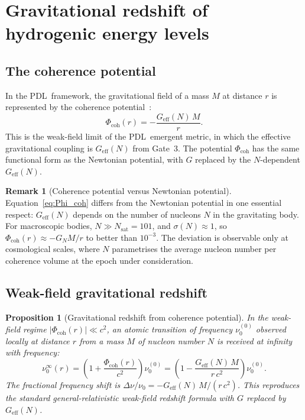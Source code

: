 \documentclass[11pt,a4paper]{article}
\newtheorem{proposition}[theorem]{Proposition}
\theoremstyle{definition}
\newtheorem{remark}[theorem]{Remark}
\newcommand{\PDL}{\textnormal{PDL}}
\newcommand{\Geff}{G_{\mathrm{eff}}}
\newcommand{\sig}{\sigma}
\newcommand{\Phicoh}{\Phi_{\mathrm{coh}}}
\begin{document}
\section{Gravitational redshift of hydrogenic energy levels}
\label{sec:redshift}

\subsection{The coherence potential}

In the \PDL\ framework, the gravitational field of a mass $M$ at distance $r$ is represented by the coherence potential~\cite{Einstein_Dirac_PDL_2026}:
\begin{equation}
\Phicoh(r) = -\frac{\Geff(N)\,M}{r}.
\label{eq:Phi_coh}
\end{equation}
This is the weak-field limit of the \PDL\ emergent metric, in which the effective gravitational coupling is $\Geff(N)$ from Gate~3. The potential $\Phicoh$ has the same functional form as the Newtonian potential, with $G$ replaced by the $N$-dependent $\Geff(N)$.

\begin{remark}[Coherence potential versus Newtonian potential]
Equation~\eqref{eq:Phi_coh} differs from the Newtonian potential in one essential respect: $\Geff(N)$ depends on the number of nucleons $N$ in the gravitating body. For macroscopic bodies, $N \gg N_{\mathrm{sat}} = 101$, and $\sig(N) \approx 1$, so $\Phicoh(r) \approx -G_N M/r$ to better than $10^{-3}$. The deviation is observable only at cosmological scales, where $N$ parametrises the average nucleon number per coherence volume at the epoch under consideration.
\end{remark}

\subsection{Weak-field gravitational redshift}

\begin{proposition}[Gravitational redshift from coherence potential]
\label{prop:redshift}
In the weak-field regime $|\Phicoh(r)| \ll c^2$, an atomic transition of frequency $\nu_0^{(0)}$ observed locally at distance $r$ from a mass $M$ of nucleon number $N$ is received at infinity with frequency:
\begin{equation}
\nu_0^\infty(r) = \left(1 + \frac{\Phicoh(r)}{c^2}\right)\nu_0^{(0)} = \left(1 - \frac{\Geff(N)\,M}{r\,c^2}\right)\nu_0^{(0)}.
\label{eq:redshift}
\end{equation}
The fractional frequency shift is $\Delta\nu/\nu_0 = -\Geff(N)\,M/(r\,c^2)$. This reproduces the standard general-relativistic weak-field redshift formula with $G$ replaced by $\Geff(N)$.
\end{proposition}
\end{document}
